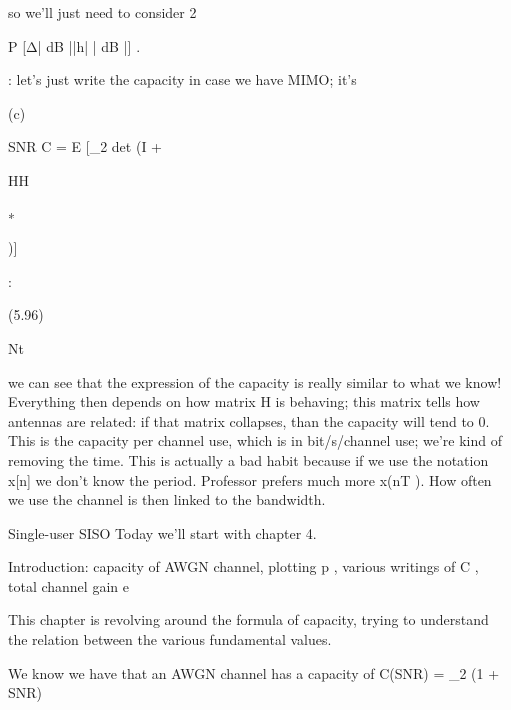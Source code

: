 {{{{{so we'll just need to consider 2

P [Δ| dB \geq ||h| | dB |] .

: let's just write the capacity in case we have MIMO; it's

(c)

SNR C = E [\log_2 det (I +

HH

∗

)]

:

(5.96)

Nt

we can see that the expression of the capacity is really similar to what we know!
Everything then depends on how matrix H is behaving; this matrix tells how antennas are related: if that matrix collapses, than the capacity will tend to 0.
This is the capacity per channel use, which is in bit/s/channel use; we're kind of removing the time. This is actually a bad habit because if we use the notation x[n] we don't know the period.
Professor prefers much more x(nT ).
How often we use the channel is then linked to the bandwidth.

Single-user SISO Today we'll start with chapter 4.

Introduction: capacity of AWGN channel, plotting p ,
various writings of C , total channel gain e

This chapter is revolving around the formula of capacity, trying to understand the relation between the various fundamental values.

We know we have that an AWGN channel has a capacity of C(SNR) = \log_2 (1 + SNR)

}}}}}
